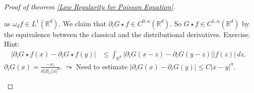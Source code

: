 \documentclass{report}
\theoremstyle{tommy}
\begin{document}
\begin{proof}[Proof of theorem \ref{Low Regularity for Poisson Equation}]
\begin{enumerate}[label=\alph*)]
        as \(\omega_d f \in L^1(\mathbb{R}^d)\). We claim that \(\partial_i G \star f \in C^{0, \alpha}(\mathbb{R}^d)\). So \(G \star f \in C^{1, \alpha}(\mathbb{R}^d)\) by the equivalence between the classical and the distributional derivatives. Exercise. Hint:
        \begin{align*}
          |\partial_i G\star f(x) - \partial_i G \star f(y)|
          &\le \int_{\mathbb{R}^d} |\partial_i G(x-z) - \partial_i G(y-z)||f(z)| \, dz,
        \end{align*}
        \(\partial_i G(x) = \frac{-x_i}{d|B_1||x|^d}\). \(\leadsto\) Need to estimate \(|\partial_i G(x) - \partial_i G(y)| \le C|x-y|^\alpha\). \qedhere
    \end{enumerate}
  \end{proof}
\end{document}
